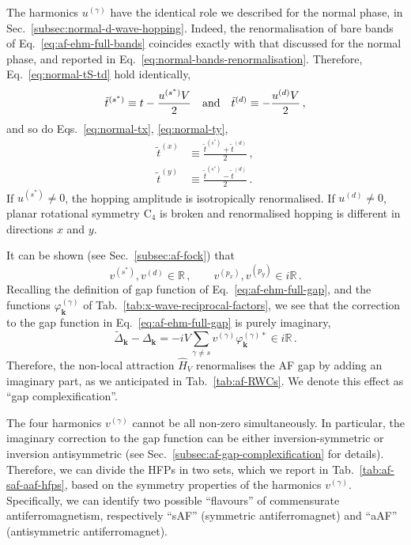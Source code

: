 The harmonics $u^{(\gamma)}$ have the identical role we described for the normal phase, in Sec.~\ref{subsec:normal-d-wave-hopping}. Indeed, the renormalisation of bare bands of Eq.~\eqref{eq:af-ehm-full-bands} coincides exactly with that discussed for the normal phase, and reported in Eq.~\eqref{eq:normal-bands-renormalisation}. Therefore, Eq.~\eqref{eq:normal-tS-td} hold identically,
\begin{equation}\label{eq:af-tS-td}
	\tilde{t}^{(s^*)} \equiv t - \frac{u^{(s^*)} V}{2}
	\qq{and}
	\tilde{t}^{(d)} \equiv - \frac{u^{(d)} V}{2} \, ,
\end{equation}
and so do Eqs.~\eqref{eq:normal-tx}, \eqref{eq:normal-ty},
\begin{align}
	\tilde{t}^{(x)} &\equiv \frac{\tilde{t}^{(s^*)} + \tilde{t}^{(d)}}{2} \, , \label{eq:af-tx} \\
	\tilde{t}^{(y)} &\equiv \frac{\tilde{t}^{(s^*)} - \tilde{t}^{(d)}}{2} \, . \label{eq:af-ty}
\end{align}
If $u^{(s^*)} \neq 0$, the hopping amplitude is isotropically renormalised. If $u^{(d)} \neq 0$, planar rotational symmetry $\mathrm{C}_4$ is broken and renormalised hopping is different in directions $x$ and $y$.

It can be shown (see Sec.~\ref{subsec:af-fock}) that
\begin{equation}\label{eq:af-v-Re-iRe}
	v^{(s^*)}, v^{(d)} \in \mathbb{R} \, ,
	\qquad
	v^{(p_x)}, v^{(p_y)} \in i\mathbb{R} \, .
\end{equation}
Recalling the definition of gap function of Eq.~\eqref{eq:af-ehm-full-gap}, and the functions $\varphi_\mathbf{k}^{(\gamma)}$ of Tab.~\ref{tab:x-wave-reciprocal-factors}, we see that the correction to the gap function in Eq.~\eqref{eq:af-ehm-full-gap} is purely imaginary,
\[
	\tilde{\Delta}_\mathbf{k} - \Delta_\mathbf{k} = 
	- iV \sum_{\gamma \neq s} v^{(\gamma)} \varphi_\mathbf{k}^{(\gamma)*} \in i\mathbb{R} \, .
\]
Therefore, the non-local attraction $\hat H_V$ renormalises the AF gap by adding an imaginary part, as we anticipated in Tab.~\ref{tab:af-RWCs}. We denote this effect as ``gap complexification''.

The four harmonics $v^{(\gamma)}$ cannot be all non-zero simultaneously. In particular, the imaginary correction to the gap function can be either inversion-symmetric or inversion antisymmetric (see Sec.~\ref{subsec:af-gap-complexification} for details). Therefore, we can divide the HFPs in two sets, which we report in Tab.~\ref{tab:af-saf-aaf-hfps}, based on the symmetry properties of the harmonics $v^{(\gamma)}$. Specifically, we can identify two possible ``flavours'' of commensurate antiferromagnetism, respectively ``sAF'' (symmetric antiferromagnet) and ``aAF'' (antisymmetric antiferromagnet).

